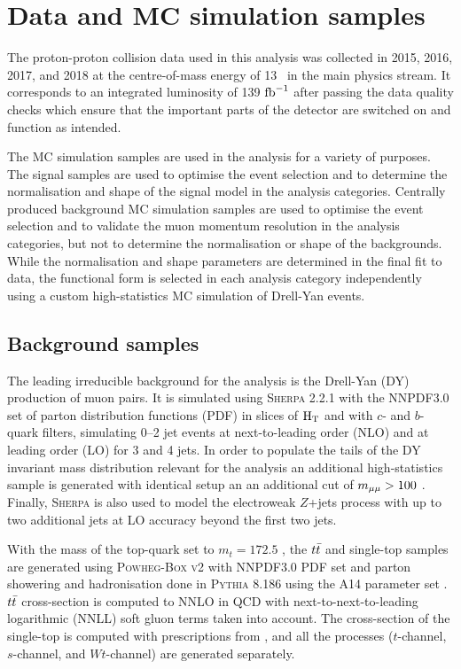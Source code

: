 \section{Data and MC simulation samples}

The proton-proton collision data used in this analysis was
collected in 2015, 2016, 2017, and 2018 at the centre-of-mass
energy of 13 \TeV~in the main physics stream. It corresponds
to an integrated luminosity of 139 $\text{fb}^{-1}$ after passing the data
quality checks which ensure that the important parts of the
detector are switched on and function as intended.

The MC simulation samples are used in the analysis for a 
variety of purposes. The signal samples are used to optimise
the event selection and to determine the normalisation and
shape of the signal model in the analysis categories.
Centrally produced background MC simulation samples are used
to optimise the event selection and to validate the muon
momentum resolution in the analysis categories, but not to
determine the normalisation or shape of the backgrounds.
While the normalisation and shape parameters are determined
in the final fit to data, the functional form is selected
in each analysis category independently using a custom
high-statistics MC simulation of Drell-Yan events.

\subsection{Background samples}

The leading irreducible background for the analysis is the
Drell-Yan (DY) production of muon pairs. It is simulated using
\textsc{Sherpa} 2.2.1 with the NNPDF3.0 set of parton
distribution functions (PDF) \cite{Ball:2014uwa} in slices of
$\text{H}_\text{T}$ and with $c$- and $b$-quark filters, simulating 0--2
jet events at next-to-leading order (NLO) and at leading order
(LO) for 3 and 4 jets. In order to populate the tails of the
DY invariant mass distribution relevant for the analysis an
additional high-statistics sample is generated with identical
setup an an additional cut of $m_{\mu\mu} > 100$ \GeV. Finally, 
\textsc{Sherpa} is also used to model the electroweak $Z$+jets
process with up to two additional jets at LO accuracy beyond
the first two jets.

With the mass of the top-quark set to $m_t = 172.5$ \GeV, the
$t\bar{t}$ and single-top samples are generated using
\textsc{Powheg-Box v2} \cite{powheg, Frixione_2007, Alioli_2010}
with NNPDF3.0 PDF set and parton showering and hadronisation
done in \textsc{Pythia} 8.186 using the A14 parameter set
\cite{ATL-PHYS-PUB-2014-021}. $t\bar{t}$ cross-section is
computed to NNLO in QCD with next-to-next-to-leading logarithmic
(NNLL) soft gluon terms taken into account. The cross-section
of the single-top is computed with prescriptions from
\cite{Kidonakis:2011wy, Kidonakis:2010ux}, and all the processes
($t$-channel, $s$-channel, and $Wt$-channel) are generated
separately.

